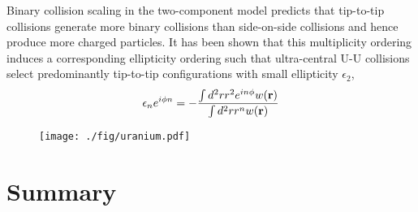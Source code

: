 \documentclass[aps,prl,reprint,amsmath,nofootinbib]{revtex4-1}
\begin{document}
Binary collision scaling in the two-component model predicts that tip-to-tip collisions generate more binary collisions than side-on-side collisions and hence produce 
more charged particles. It has been shown that this multiplicity ordering induces a corresponding ellipticity ordering such that ultra-central U-U collisions select predominantly
tip-to-tip configurations with small ellipticity $\epsilon_2$,
\begin{equation}
 \epsilon_n e^{i \phi n} = -\frac{\int d^2r r^2 e^{i n \phi} w({\bf r})}{\int d^2r r^n w({\bf r})}
\end{equation}
 
\begin{figure}[ht]
 \centering
 \texttt{[image: ./fig/uranium.pdf]}
\end{figure}


\section{Summary}


\end{document}
